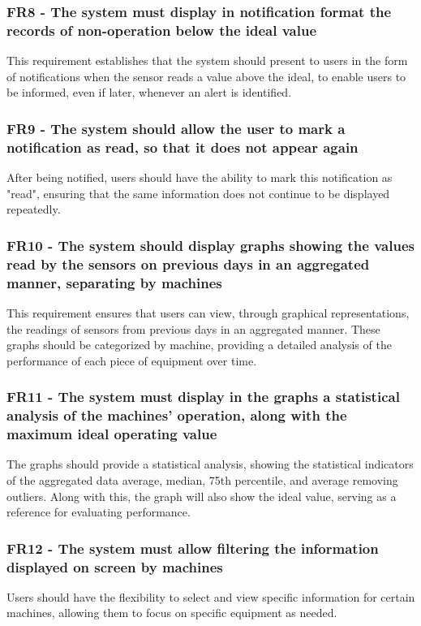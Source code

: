 \subsubsection{FR8 - The system must display in notification format the records of non-operation below the ideal value}This requirement establishes that the system should present to users in the form of notifications when the sensor reads a value above the ideal, to enable users to be informed, even if later, whenever an alert is identified.

\subsubsection{FR9 - The system should allow the user to mark a notification as read, so that it does not appear again}
After being notified, users should have the ability to mark this notification as "read", ensuring that the same information does not continue to be displayed repeatedly.

\subsubsection{FR10 - The system should display graphs showing the values read by the sensors on previous days in an aggregated manner, separating by machines}This requirement ensures that users can view, through graphical representations, the readings of sensors from previous days in an aggregated manner. These graphs should be categorized by machine, providing a detailed analysis of the performance of each piece of equipment over time.

\subsubsection{FR11 - The system must display in the graphs a statistical analysis of the machines' operation, along with the maximum ideal operating value}
The graphs should provide a statistical analysis, showing the statistical indicators of the aggregated data average, median, 75th percentile, and average removing outliers. Along with this, the graph will also show the ideal value, serving as a reference for evaluating performance.

\subsubsection{FR12 - The system must allow filtering the information displayed on screen by machines}
Users should have the flexibility to select and view specific information for certain machines, allowing them to focus on specific equipment as needed.

